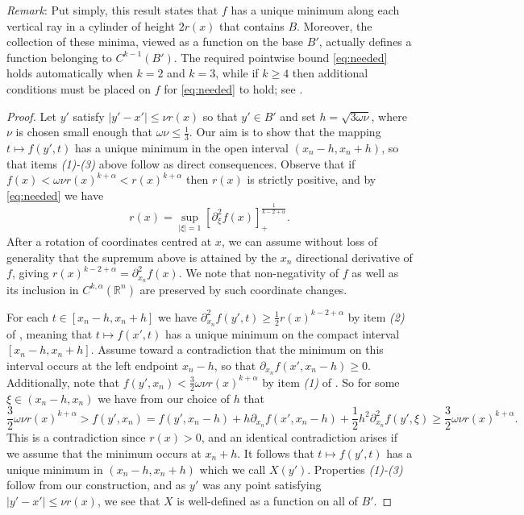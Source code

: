 \documentclass[oneside,hidelinks,indentfirst,10pt]{book}
\begin{document}
\medskip

\textit{Remark}: Put simply, this result states that \(f\) has a unique minimum along each vertical ray in a cylinder of height \(2r(x)\) that contains \(B\). Moreover, the collection of these minima, viewed as a function on the base \(B'\), actually defines a function belonging to \(C^{k-1}(B')\). The required pointwise bound \eqref{eq:needed} holds automatically when \(k=2\) and \(k=3\), while if \(k\geq 4\) then additional conditions must be placed on \(f\) for \eqref{eq:needed} to hold; see .


\begin{proof}
Let \(y'\) satisfy \(|y'-x'|\leq \nu r(x)\) so that \(y'\in B'\) and set \(h=\sqrt{3\omega\nu}\), where \(\nu\) is chosen small enough that \(\omega\nu\leq \frac{1}{3}\). Our aim is to show that the mapping \(t\mapsto f(y',t)\) has a unique minimum in the open interval \((x_n-h,x_n+h)\), so that items \textit{(1)-(3)} above follow as direct consequences. Observe that if \(f(x)<\omega\nu r(x)^{k+\alpha}< r(x)^{k+\alpha}\) then \(r(x)\) is strictly positive, and by \eqref{eq:needed} we have
\[
    r(x)=\sup_{|\xi|=1}[\partial^2_\xi f(x)]_+^\frac{1}{k-2+\alpha}.
\]
After a rotation of coordinates centred at \(x\), we can assume without loss of generality that the supremum above is attained by the \(x_n\) directional derivative of \(f\), giving \(r(x)^{k-2+\alpha}=\partial^2_{x_n}f(x)\). We note that non-negativity of \(f\) as well as its inclusion in \(C^{k,\alpha}(\mathbb{R}^n)\) are preserved by such coordinate changes. 


For each \(t\in [x_n-h,x_n+h]\) we have \(\partial^2_{x_n}f(y',t)\geq\frac{1}{2}r(x)^{k-2+\alpha}\) by item \textit{(2)} of , meaning that \(t\mapsto f(x',t)\) has a unique minimum on the compact interval \([x_n-h ,x_n+h]\).  Assume toward a contradiction that the minimum on this interval occurs at the left endpoint \(x_n-h\), so that \(\partial_{x_n}f(x',x_n-h)\geq 0\). Additionally, note that \(f(y',x_n)<\frac{3}{2}\omega\nu r(x)^{k+\alpha}\) by item \textit{(1)} of . So for some \(\xi\in (x_n-h,x_n)\) we have from our choice of \(h\) that
\[
     \frac{3}{2}\omega\nu r(x)^{k+\alpha}>f(y',x_n)=f(y',x_n-h)+h\partial_{x_n}f(x',x_n-h)+\frac{1}{2}h^2\partial^2_{x_n}f(y',\xi)\geq \frac{3}{2}\omega\nu r(x)^{k+\alpha}.
\]
This is a contradiction since \(r(x)>0\), and an identical contradiction arises if we assume that the minimum occurs at \(x_n+h\). It follows that \(t\mapsto f(y',t)\) has a unique minimum in \((x_n-h,x_n+h)\) which we call \(X(y')\). Properties \textit{(1)-(3)} follow from our construction, and as \(y'\) was any point satisfying \(|y'-x'|\leq \nu r(x)\), we see that \(X\) is well-defined as a function on all of \( B'\).



\end{proof}
\end{document}
